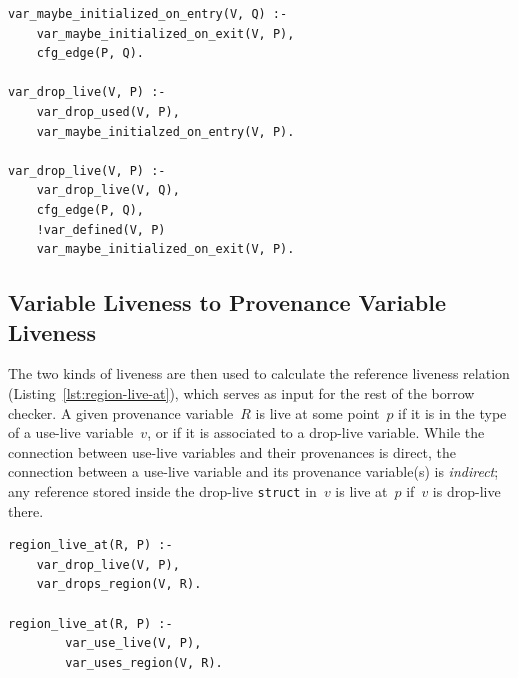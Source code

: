 \documentclass[11pt,a4paper,twoside,openany]{report}
\newenvironment{sourcecode}{\captionsetup{type=listing}}{}
\newcommand{\InRust}[1]{\texttt{#1}}
\begin{document}
\begin{sourcecode}
  \label{lst:use-live}
\begin{verbatim}
var_maybe_initialized_on_entry(V, Q) :-
    var_maybe_initialized_on_exit(V, P),
    cfg_edge(P, Q).

var_drop_live(V, P) :-
    var_drop_used(V, P),
    var_maybe_initialzed_on_entry(V, P).

var_drop_live(V, P) :-
    var_drop_live(V, Q),
    cfg_edge(P, Q),
    !var_defined(V, P)
    var_maybe_initialized_on_exit(V, P).
\end{verbatim}
\end{sourcecode}

\subsection{Variable Liveness to Provenance Variable Liveness}\label{sec:region-live-at}

The two kinds of liveness are then used to calculate the reference liveness
relation (Listing~\ref{lst:region-live-at}), which serves as input for the rest
of the borrow checker. A given provenance variable~$R$ is live at some point~$p$
if it is in the type of a use-live variable~$v$, or if it is associated to a
drop-live variable. While the connection between use-live variables and their
provenances is direct, the connection between a use-live variable and its
provenance variable(s) is \textit{indirect}; any reference stored inside the
drop-live \InRust{struct} in~$v$ is live at~$p$ if~$v$ is drop-live there.

\begin{sourcecode}
  \label{lst:region-live-at}
\begin{verbatim}
region_live_at(R, P) :-
    var_drop_live(V, P),
    var_drops_region(V, R).
        
region_live_at(R, P) :-
        var_use_live(V, P),
        var_uses_region(V, R).
\end{verbatim}
\end{sourcecode}
\end{document}
